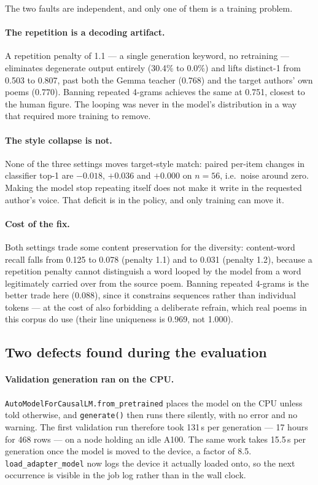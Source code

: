 \documentclass[11pt]{article}
\begin{document}
The two faults are independent, and only one of them is a training problem.

\paragraph{The repetition is a decoding artifact.} A repetition penalty of
1.1 --- a single generation keyword, no retraining --- eliminates degenerate
output entirely (30.4\% to 0.0\%) and lifts distinct-1 from 0.503 to 0.807,
past both the Gemma teacher (0.768) and the target authors' own poems
(0.770). Banning repeated 4-grams achieves the same at 0.751, closest to the
human figure. The looping was never in the model's distribution in a way that
required more training to remove.

\paragraph{The style collapse is not.} None of the three settings moves
target-style match: paired per-item changes in classifier top-1 are $-0.018$,
$+0.036$ and $+0.000$ on $n=56$, i.e.\ noise around zero. Making the model
stop repeating itself does not make it write in the requested author's voice.
That deficit is in the policy, and only training can move it.

\paragraph{Cost of the fix.} Both settings trade some content preservation
for the diversity: content-word recall falls from 0.125 to 0.078 (penalty
1.1) and to 0.031 (penalty 1.2), because a repetition penalty cannot
distinguish a word looped by the model from a word legitimately carried over
from the source poem. Banning repeated 4-grams is the better trade here
(0.088), since it constrains sequences rather than individual tokens --- at
the cost of also forbidding a deliberate refrain, which real poems in this
corpus do use (their line uniqueness is 0.969, not 1.000).

\subsection{Two defects found during the evaluation}

\paragraph{Validation generation ran on the CPU.}
\texttt{AutoModelForCausalLM.from\_pretrained} places the model on the CPU
unless told otherwise, and \texttt{generate()} then runs there silently, with
no error and no warning. The first validation run therefore took 131\,s per
generation --- 17 hours for 468 rows --- on a node holding an idle A100. The
same work takes 15.5\,s per generation once the model is moved to the device,
a factor of 8.5. \texttt{load\_adapter\_model} now logs the device it actually
loaded onto, so the next occurrence is visible in the job log rather than in
the wall clock.
\end{document}
